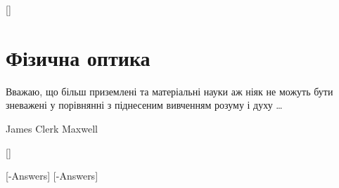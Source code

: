 \documentclass[%
biblatex,%
]{ProblemBook}
\begin{document}
%
\multiinclude{\ChaptersOne}[]





\part{Фізична оптика}
\epigraph{\Annabelle  Вважаю, що більш приземлені та матеріальні науки аж ніяк не можуть бути зневажені у порівнянні з піднесеним вивченням розуму і духу \ldots}{James Clerk Maxwell}
%
\multiinclude{\ChaptersTwo}[]






\answers
\multiinclude{\ChaptersOne}[-Answers]
\multiinclude{\ChaptersTwo}[-Answers]







\appendix
%


%






\end{document}
